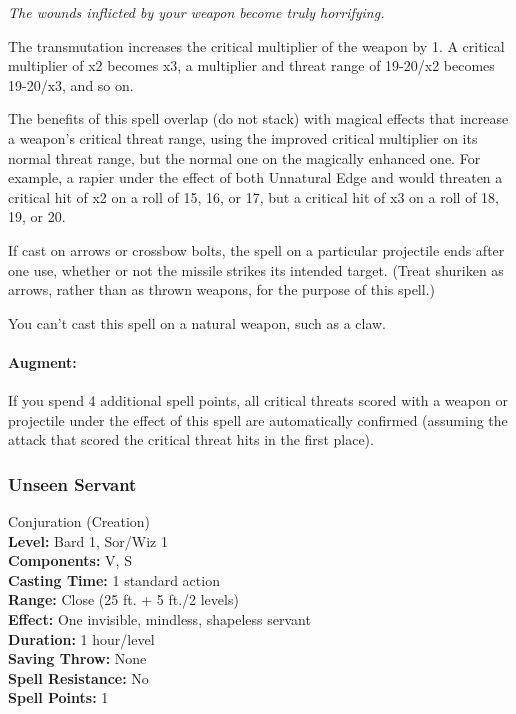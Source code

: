 \emph{The wounds inflicted by your weapon become truly horrifying.}

The transmutation increases the critical multiplier of the weapon by 1. 
A critical multiplier of x2 becomes x3, a multiplier and threat range of 19-20/x2 becomes 19-20/x3, and so on. 

The benefits of this spell overlap (do not stack) with magical effects that increase a weapon's critical threat range, using the improved critical multiplier on its normal threat range, but the normal one on the magically enhanced one.
For example, a rapier under the effect of both Unnatural Edge and  would threaten a critical hit of x2 on a roll of 15, 16, or 17, but a critical hit of x3 on a roll of 18, 19, or 20.

If cast on arrows or crossbow bolts, the spell on a particular projectile ends after one use, whether or not the missile strikes its intended target. (Treat shuriken as arrows, rather than as thrown weapons, for the purpose of this spell.)

You can't cast this spell on a natural weapon, such as a claw.

\paragraph{Augment:} If you spend 4 additional spell points, all critical threats scored with a weapon or projectile under the effect of this spell are automatically confirmed (assuming the attack that scored the critical threat hits in the first place).
\subsubsection{Unseen Servant}
\label{Spell:UnseenServant}
Conjuration (Creation)
\\ \textbf{Level:} Bard 1, Sor/Wiz 1
\\ \textbf{Components:} V, S
\\ \textbf{Casting Time:} 1 standard action
\\ \textbf{Range:} Close (25 ft. + 5 ft./2 levels)
\\ \textbf{Effect:} One invisible, mindless, shapeless servant
\\ \textbf{Duration:} 1 hour/level
\\ \textbf{Saving Throw:} None
\\ \textbf{Spell Resistance:} No
\\ \textbf{Spell Points:} 1

